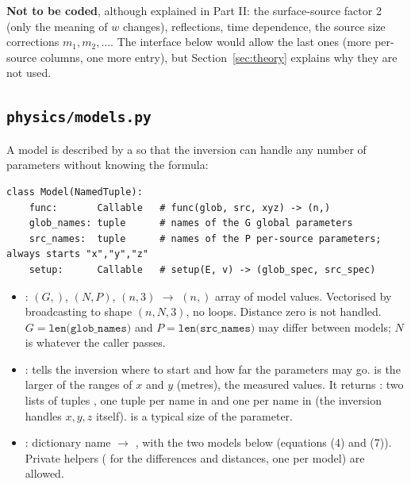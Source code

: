 \documentclass{article}
\begin{document}
\noindent \textbf{Not to be coded}, although explained in Part II: the surface-source factor 2
(only the meaning of $w$ changes), reflections, time dependence, the source size
corrections $m_1,m_2,\dots$. The interface below would allow the last ones (more
per-source columns, one more  entry), but Section~\ref{sec:theory}
explains why they are not used.

\subsection{\texttt{physics/models.py}}
\label{sec:model}

A model is described by a  so that the inversion can handle any
number of parameters without knowing the formula:

\begin{lstlisting}
class Model(NamedTuple):
    func:       Callable   # func(glob, src, xyz) -> (n,)
    glob_names: tuple      # names of the G global parameters
    src_names:  tuple      # names of the P per-source parameters; always starts "x","y","z"
    setup:      Callable   # setup(E, v) -> (glob_spec, src_spec)
\end{lstlisting}

\begin{itemize}
\item {}:  $(G,)$,  $(N,P)$,
       $(n,3)$ $\to$ $(n,)$ array of model values. Vectorised by
      broadcasting to shape $(n,N,3)$, no loops. Distance zero is not handled.
      $G=\texttt{len(glob\_names)}$ and $P=\texttt{len(src\_names)}$ may differ
      between models; $N$ is whatever the caller passes.
\item {}: tells the inversion where to start and how far the
      parameters may go.  is the larger of the ranges of $x$ and $y$
      (metres),  the measured values. It returns
      : two lists of tuples
      , one tuple per name in 
      and one per name in  (the inversion handles $x,y,z$
      itself).  is a typical size of the parameter.
\item {}: dictionary name $\to$ , with the two models below (equations (4) and (7)).
      Private helpers ( for the differences and distances,
      one  per model) are allowed.
\end{itemize}
\end{document}
